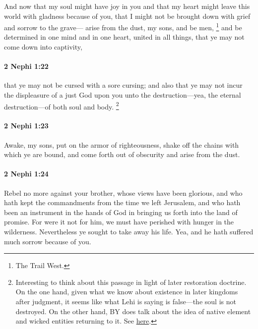 			And now that my soul might have joy in you
			and that my heart might leave this world with gladness because of you,
			that I might not be brought down with grief and sorrow to the grave---
			arise from the dust, my sons, and be men,%
				\footnote{%
					\label{2NEPHI-1-21-men}%
					The Trail West.
					}
			and be determined in one mind and in one heart, united in all things,
			that ye may not come down into captivity,

		\paragraph{2 Nephi 1:22} %
			\label{2NEPHI-1-22}

			that ye may not be cursed with a sore cursing;
			and also that ye may not incur the displeasure of a just God upon you
			unto the destruction---yea, the eternal destruction---of both soul and body.%
				\footnote{%
					\label{2NEPHI-1-22-destruction}%
					Interesting to think about this passage in light of later restoration doctrine. On the one hand, given what we know about existence in later kingdoms after judgment, it seems like what Lehi is saying is false---the soul is not destroyed. On the other hand, BY does talk about the idea of native element and wicked entities returning to it. See \hyperref[NATIVEELEMENT-study]{here}.
					}

		\paragraph{2 Nephi 1:23} %
			\label{2NEPHI-1-23}

			Awake, my sons, put on the armor of righteousness,
			shake off the chains with which ye are bound,
			and come forth out of obscurity and arise from the dust.

		\paragraph{2 Nephi 1:24} %
			\label{2NEPHI-1-24}

			Rebel no more against your brother,
			whose views have been glorious,
			and who hath kept the commandments from the time we left Jerusalem,
			and who hath been an instrument in the hands of God
			in bringing us forth into the land of promise.
			For were it not for him, we must have perished with hunger in the wilderness.
			Nevertheless ye sought to take away his life.
			Yea, and he hath suffered much sorrow because of you.

